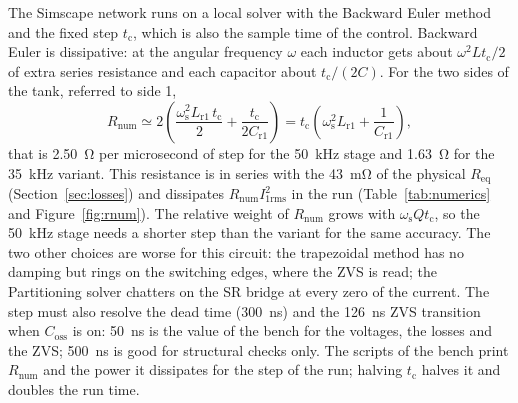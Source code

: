 \documentclass[12pt,a4paper]{scrartcl}
\newcommand{\ped}[1]{_{\mathrm{#1}}}
\begin{document}
\begin{onehalfspace}
The Simscape network runs on a local solver with the Backward Euler method and the fixed step $t\ped{c}$, which is also the sample time of the control. Backward Euler is dissipative: at the angular frequency $\omega$ each inductor gets about $\omega^2 L t\ped{c}/2$ of extra series resistance and each capacitor about $t\ped{c}/(2C)$. For the two sides of the tank, referred to side 1,
\begin{equation}
	R\ped{num} \simeq 2\left(\frac{\omega\ped{s}^2 L\ped{r1}\,t\ped{c}}{2} + \frac{t\ped{c}}{2 C\ped{r1}}\right) = t\ped{c}\left(\omega\ped{s}^2 L\ped{r1} + \frac{1}{C\ped{r1}}\right),
	\label{eq:rnum}
\end{equation}
that is \SI{2.50}{\ohm} per microsecond of step for the \SI{50}{\kilo\hertz} stage and \SI{1.63}{\ohm} for the \SI{35}{\kilo\hertz} variant. This resistance is in series with the \SI{43}{\milli\ohm} of the physical $R\ped{eq}$ (Section~\ref{sec:losses}) and dissipates $R\ped{num} I\ped{1rms}^2$ in the run (Table~\ref{tab:numerics} and Figure~\ref{fig:rnum}). The relative weight of $R\ped{num}$ grows with $\omega\ped{s} Q t\ped{c}$, so the \SI{50}{\kilo\hertz} stage needs a shorter step than the variant for the same accuracy. The two other choices are worse for this circuit: the trapezoidal method has no damping but rings on the switching edges, where the ZVS is read; the Partitioning solver chatters on the SR bridge at every zero of the current. The step must also resolve the dead time (\SI{300}{\nano\second}) and the \SI{126}{\nano\second} ZVS transition when $C\ped{oss}$ is on: \SI{50}{\nano\second} is the value of the bench for the voltages, the losses and the ZVS; \SI{500}{\nano\second} is good for structural checks only. The scripts of the bench print $R\ped{num}$ and the power it dissipates for the step of the run; halving $t\ped{c}$ halves it and doubles the run time.


\end{onehalfspace}
\end{document}

